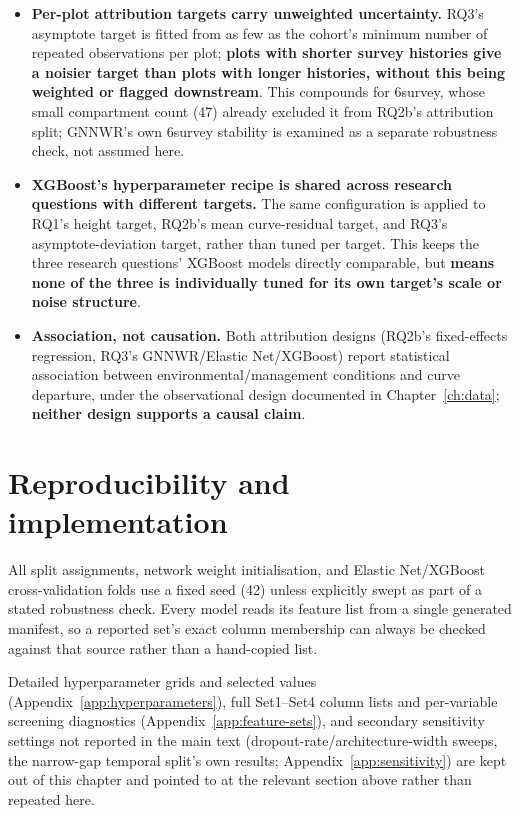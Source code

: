 \documentclass[11pt,a4paper]{report}
\begin{document}
\begin{itemize}
\item \textbf{Per-plot attribution targets carry unweighted uncertainty.} RQ3's asymptote target is fitted from as few as the cohort's minimum number of repeated observations per plot; \textbf{plots with shorter survey histories give a noisier target than plots with longer histories, without this being weighted or flagged downstream}. This compounds for 6survey, whose small compartment count (47) already excluded it from RQ2b's attribution split; GNNWR's own 6survey stability is examined as a separate robustness check, not assumed here.
\item \textbf{XGBoost's hyperparameter recipe is shared across research questions with different targets.} The same configuration is applied to RQ1's height target, RQ2b's mean curve-residual target, and RQ3's asymptote-deviation target, rather than tuned per target. This keeps the three research questions' XGBoost models directly comparable, but \textbf{means none of the three is individually tuned for its own target's scale or noise structure}.
\item \textbf{Association, not causation.} Both attribution designs (RQ2b's fixed-effects regression, RQ3's GNNWR/Elastic Net/XGBoost) report statistical association between environmental/management conditions and curve departure, under the observational design documented in Chapter~\ref{ch:data}; \textbf{neither design supports a causal claim}.
\end{itemize}

\section{Reproducibility and implementation}
All split assignments, network weight initialisation, and Elastic Net/XGBoost cross-validation folds use a fixed seed (42) unless explicitly swept as part of a stated robustness check. Every model reads its feature list from a single generated manifest, so a reported set's exact column membership can always be checked against that source rather than a hand-copied list.

Detailed hyperparameter grids and selected values (Appendix~\ref{app:hyperparameters}), full Set1--Set4 column lists and per-variable screening diagnostics (Appendix~\ref{app:feature-sets}), and secondary sensitivity settings not reported in the main text (dropout-rate/architecture-width sweeps, the narrow-gap temporal split's own results; Appendix~\ref{app:sensitivity}) are kept out of this chapter and pointed to at the relevant section above rather than repeated here.
\end{document}
